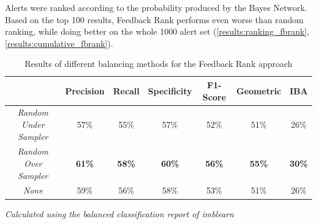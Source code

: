 Alerts were ranked according to the probability produced by the Bayes Network. Based on the top 100 results, Feedback Rank performs even worse than random ranking, while doing better on the whole 1000 alert set (\cref{results:ranking_fbrank}, \cref{results:cumulative_fbrank}).

\begin{table}[H]
	\caption{Results of different balancing methods for the Feedback Rank approach}
	\label{result:fbrank}
	\centering
	\begin{tabular}{@{}ccccccc@{}}
		\toprule
		& \textbf{Precision} & \textbf{Recall} & \textbf{Specificity} & \textbf{F1-Score} & \textbf{Geometric} & \textbf{IBA}  \\ \midrule
		\textit{Random Under Sampler}  & 57\%               & 55\%            & 57\%                 & 52\%              & 51\%               & 26\%          \\
		\textit{Random Over Sampler} & \textbf{61\%}      & \textbf{58\%}   & \textbf{60\%}        & \textbf{56\%}     & \textbf{55\%}      & \textbf{30\%} \\
		\textit{None}                 & 59\%               & 56\%            & 58\%                 & 53\%              & 51\%               & 26\%          \\ \bottomrule
	\end{tabular}

	\textit{Calculated using the balanced classification report of \textit{imblearn} \cite{imblearn}}
\end{table}


